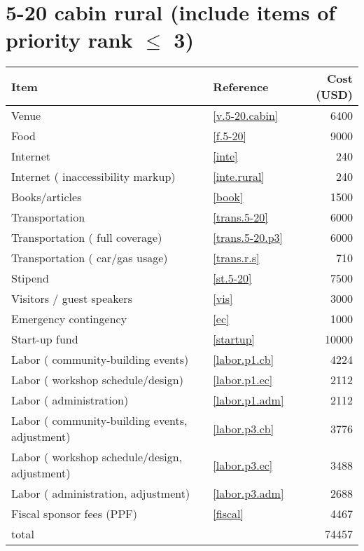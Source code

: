 \section*{5-20 cabin rural (include items of priority rank $\leq$ 3)}
\begin{center}
\begin{tabular}{llr}
Item & Reference & Cost (USD) \\ \hline
Venue & \ref{v.5-20.cabin} & 6400 \\
Food & \ref{f.5-20} & 9000 \\
Internet & \ref{inte} & 240 \\
Internet ( inaccessibility markup) & \ref{inte.rural} & 240 \\
Books/articles & \ref{book} & 1500 \\
Transportation & \ref{trans.5-20} & 6000 \\
Transportation ( full coverage) & \ref{trans.5-20.p3} & 6000 \\
Transportation ( car/gas usage) & \ref{trans.r.s} & 710 \\
Stipend & \ref{st.5-20} & 7500 \\
Visitors / guest speakers & \ref{vis} & 3000 \\
Emergency contingency & \ref{ec} & 1000 \\
Start-up fund & \ref{startup} & 10000 \\
Labor ( community-building events) & \ref{labor.p1.cb} & 4224 \\
Labor ( workshop schedule/design) & \ref{labor.p1.ec} & 2112 \\
Labor ( administration) & \ref{labor.p1.adm} & 2112 \\
Labor ( community-building events, adjustment) & \ref{labor.p3.cb} & 3776 \\
Labor ( workshop schedule/design, adjustment) & \ref{labor.p3.ec} & 3488 \\
Labor ( administration, adjustment) & \ref{labor.p3.adm} & 2688 \\
Fiscal sponsor fees (PPF) & \ref{fiscal} & 4467 \\ \hline
total &  & 74457
\end{tabular}
\end{center}
\newpage
